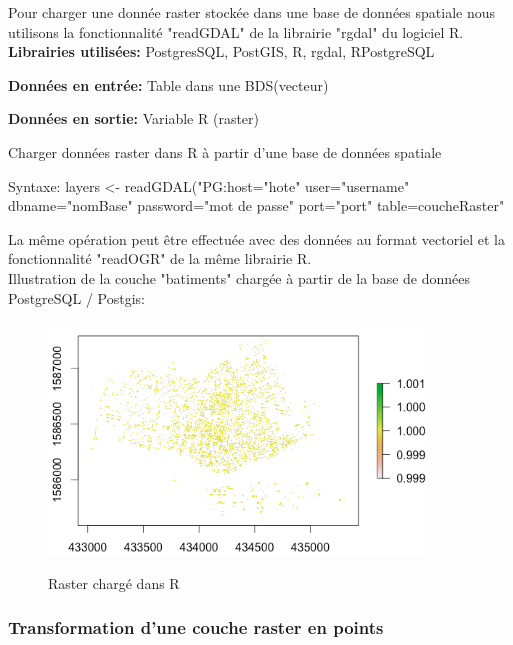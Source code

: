 Pour charger une donnée raster stockée dans une base de données spatiale nous utilisons la fonctionnalité "readGDAL" de la librairie "rgdal" du logiciel R. \\

\textbf{Librairies utilisées:} PostgresSQL, PostGIS, R, rgdal, RPostgreSQL 

\textbf{Données en entrée:} Table dans une BDS(vecteur)

\textbf{Données en sortie:} Variable R (raster)\\

\begin{algorithm}[H]
\caption{\label{chargerraster} Charger données raster dans R à partir d'une base de données spatiale}
Syntaxe:
layers <- readGDAL("PG:host="hote" user="username" dbname="nomBase" password="mot de passe" port="port" table=coucheRaster" \\
\end{algorithm}

La même opération peut être effectuée avec des données au format vectoriel et la fonctionnalité "readOGR" de la même librairie R.\\
Illustration de la couche "batiments" chargée à partir de la base de données PostgreSQL / Postgis:

\begin{center}
\begin{figure}[h] \centering 
\includegraphics[width=10cm]{rasterbati2}\\
\caption{\label{rasterbati} Raster chargé dans R}
\end{figure}
\end{center}


\subsubsection{Transformation d'une couche raster en points}

